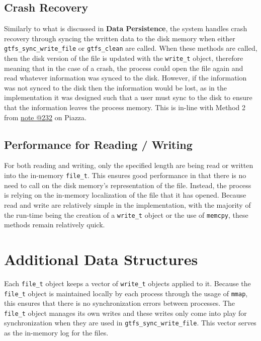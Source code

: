 \documentclass{article}
\begin{document}
\subsection*{Crash Recovery}
Similarly to what is discussed in \textbf{Data Persistence}, the system handles crash recovery through syncing the written data to the disk memory when either \texttt{gtfs\_sync\_write\_file} or \texttt{gtfs\_clean} are called. When these methods are called, then the disk version of the file is updated with the \texttt{write\_t} object, therefore meaning that in the case of a crash, the process could open the file again and read whatever information was synced to the disk. However, if the information was not synced to the disk then the information would be lost, as in the implementation it was designed such that a user must sync to the disk to ensure that the information leaves the process memory. This is in-line with Method 2 from \href{https://piazza.com/class/m00d9edry1e5xc/post/232}{note @232} on Piazza.
\subsection*{Performance for Reading / Writing}
For both reading and writing, only the specified length are being read or written into the in-memory \texttt{file\_t}. This ensures good performance in that there is no need to call on the disk memory's representation of the file. Instead, the process is relying on the in-memory localization of the file that it has opened. Because read and write are relatively simple in the implementation, with the majority of the run-time being the creation of a \texttt{write\_t} object or the use of \texttt{memcpy}, these methods remain relatively quick.
\section*{Additional Data Structures}
Each \texttt{file\_t} object keeps a vector of \texttt{write\_t} objects applied to it. Because the \texttt{file\_t} object is maintained locally by each process through the usage of \texttt{mmap}, this ensures that there is no synchronization errors between processes. The \texttt{file\_t} object manages its own writes and these writes only come into play for synchronization when they are used in \texttt{gtfs\_sync\_write\_file}. This vector serves as the in-memory log for the files. 
\end{document}
